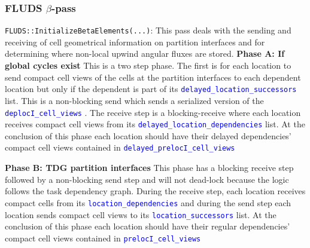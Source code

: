 \documentclass[11pt,letterpaper,titlepage]{article}
\newcommand{\xmltag}[1]{\textcolor{blue}{ \texttt{#1}} }
\numberwithin{equation}{section}
\begin{document}
\subsubsection{FLUDS $\beta$-pass}
\texttt{FLUDS::InitializeBetaElements(...)}:\newline
This pass deals with the sending and receiving of cell geometrical information on partition interfaces and for determining where non-local upwind angular fluxes are stored.
\newline
\newline
\textbf{Phase A: If global cycles exist}\newline
This is a two step phase. The first is for each location to send compact cell views of the cells at the partition interfaces to each dependent location but only if the dependent is part of its \xmltag{delayed\_location\_successors} list. This is a non-blocking send which sends a serialized version of the \xmltag{deplocI\_cell\_views}. The receive step is a blocking-receive where each location receives compact cell views from its \xmltag{delayed\_location\_dependencies} list.
\newline
\newline
At the conclusion of this phase each location should have their delayed dependencies' compact cell views contained in \xmltag{delayed\_prelocI\_cell\_views}

\vspace{0.25in}
\textbf{Phase B: TDG partition interfaces}\newline
This phase has a blocking receive step followed by a non-blocking send step and will not dead-lock because the logic follows the task dependency graph. During the receive step, each location receives compact cells from its \xmltag{location\_dependencies} and during the send step each location sends compact cell views to its \xmltag{location\_successors} list.
\newline
\newline
At the conclusion of this phase each location should have their regular dependencies' compact cell views contained in \xmltag{prelocI\_cell\_views}
\end{document}
